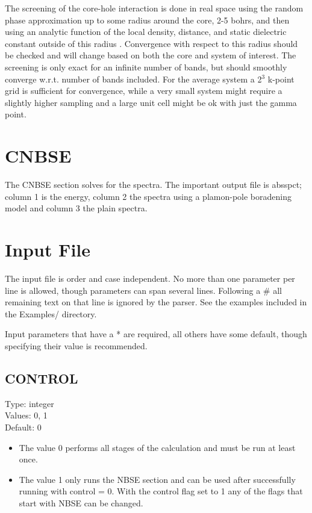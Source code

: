 \documentclass[12pt]{revtex4}
\begin{document}
The screening of the core-hole interaction is done in real space using the random phase approximation up to 
some radius around the core, 2-5 bohrs, and then using an analytic function of the local density, distance, 
and static dielectric constant outside of this radius \cite{screening}. Convergence with respect to this radius should be 
checked and will change based on both the core and system of interest. The screening is only exact for an 
infinite number of bands, but should smoothly converge w.r.t. number of bands included. For the average 
system a 2$^3$ k-point grid is sufficient for convergence, while a very small system might require a 
slightly higher sampling and a large unit cell might be ok with just the gamma point.

\section{ CNBSE }
The CNBSE section solves for the spectra. The important output file is absspct; column 1 is the energy, 
column 2 the spectra using a plamon-pole boradening model and column 3 the plain spectra.

\section{Input File}
\label{sec:Control-Items}
The input file is order and case independent. No more than one parameter per line is allowed, though parameters can span several lines. Following a \# all remaining text on that line is ignored by the parser. See the examples included in the Examples/ directory.  

Input parameters that have a * are required, all others have some default, though specifying their value is recommended.

\subsection{CONTROL}
Type: integer \\
Values: 0, 1 \\
Default: 0
\begin{itemize}
\item The value 0 performs all stages of the calculation and must be run at least once. 

\item The value 1 only runs the \textsc{NBSE} section and can be used after successfully running with control = 0. With the control flag set to 1 any of the flags that start with NBSE can be changed.
\end{itemize}
\end{document}
